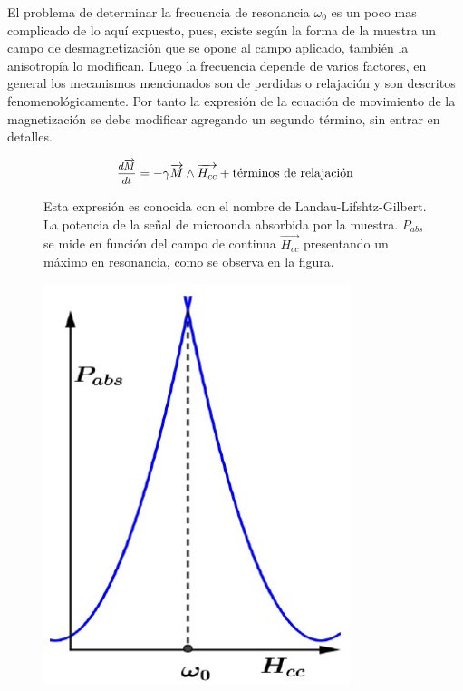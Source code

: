 El problema de determinar la frecuencia de resonancia $\omega_{0}$ es un poco mas complicado de lo aquí expuesto, pues, existe según la forma de la muestra un campo de desmagnetización que se opone al campo aplicado, también la anisotropía lo modifican. Luego la frecuencia depende de varios factores, en general los mecanismos mencionados son de perdidas o relajación y son descritos fenomenológicamente. Por tanto la expresión de la ecuación de movimiento de la magnetización se debe modificar agregando un segundo término, sin entrar en detalles.


\begin{equation*}
	\mfrac{d\overrightarrow{M}}{dt}=-\gamma \overrightarrow{M}\wedge \overrightarrow{H_{cc}} + \text{términos de relajación}
\end{equation*}

\begin{figure}[H]
  \begin{minipage}[b]{0.47\textwidth}
Esta expresión es conocida con el nombre de Landau-Lifshtz-Gilbert. La potencia de la señal de microonda absorbida por la muestra. $P_{abs}$ se mide en función del campo de continua $\overrightarrow{H_{cc}}$ presentando un máximo en resonancia, como se observa en la figura.
  \vspace{1.5cm}
  \end{minipage}
  \hfill
  \begin{minipage}[b]{0.47\textwidth}
     \includegraphics[width=0.8\textwidth]{./Figures/fig334}
	\label{fig:334}
	  \vspace{0.0cm}
  \end{minipage}
\end{figure}

